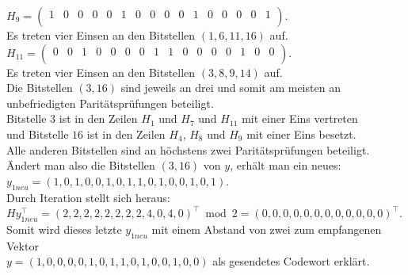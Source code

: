 \begin{Beispiel}
        $H_9= \left( \begin{array}{rrrrrrrrrrrrrrrr}
            1 & 0 & 0 & 0 & 0 & 1 & 0 & 0 & 0 & 0 & 1 & 0 & 0 & 0 & 0 & 1 \\
           \end{array}\right). 
        $\\
        Es treten vier Einsen an den Bitstellen $(1, 6, 11, 16)$ auf.\\
        
        $H_{11}= \left( \begin{array}{rrrrrrrrrrrrrrrr}
            0 & 0 & 1 & 0 & 0 & 0 & 0 & 1 & 1 & 0 & 0 & 0 & 0 & 1 & 0 & 0 \\
           \end{array}\right). 
        $\\
        Es treten vier Einsen an den Bitstellen $(3, 8, 9, 14)$ auf.\\
        
        Die Bitstellen $(3, 16)$ sind jeweils an drei und somit am meisten an unbefriedigten Paritätsprüfungen beteiligt.\\ 
        Bitstelle $3$ ist in den Zeilen $H_1$ und $H_7$ und $H_{11}$ mit einer Eins vertreten\\
        und Bitstelle $16$ ist in den Zeilen $H_4$, $H_8$ und $H_9$ mit einer Eins besetzt.\\
        Alle anderen Bitstellen sind an höchstens zwei Paritätsprüfungen beteiligt.\\
         
        Ändert man also die Bitstellen $(3, 16)$ von $y$, erhält man ein neues:\\
        $y_{1neu} = (1,0,1,0,0,1,0,1,1,0,1,0,0,1,0,1).$\\
        
        Durch Iteration stellt sich heraus:\\
        $Hy_{1neu}^\intercal = (2,2,2,2,2,2,2,2,4,0,4,0)^\intercal \bmod 2 =(0,0,0,0,0,0,0,0,0,0,0,0)^\intercal.$\\
        
        Somit wird dieses letzte $y_{1neu}$ mit einem Abstand von zwei zum empfangenen Vektor\\
        $y = (1,0,0,0,0,1,0,1,1,0,1,0,0,1,0,0)$ als gesendetes Codewort erklärt.\\
        
    \end{Beispiel}
    \pagebreak
    
